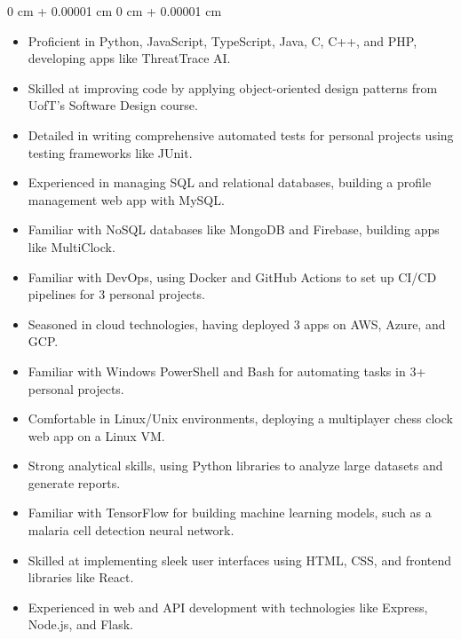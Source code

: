 \documentclass[10pt, letterpaper]{article}
\newenvironment{highlightsforbulletentries}{
    \begin{itemize}[
        topsep=0.10 cm,
        parsep=0.10 cm,
        partopsep=0pt,
        itemsep=0pt,
        leftmargin=10pt
    ]
}{
    \end{itemize}
} %
\newenvironment{onecolentry}{
    \begin{adjustwidth}{
        0 cm + 0.00001 cm
    }{
        0 cm + 0.00001 cm
    }
}{
    \end{adjustwidth}
} %
\begin{document}
    \begin{onecolentry}
        \begin{highlightsforbulletentries}


        \item Proficient in Python, JavaScript, TypeScript, Java, C, C++, and PHP, developing apps like ThreatTrace AI.

        \item Skilled at improving code by applying object-oriented design patterns from UofT’s Software Design course.

        \item Detailed in writing comprehensive automated tests for personal projects using testing frameworks like JUnit.

        \item Experienced in managing SQL and relational databases, building a profile management web app with MySQL.

        \item Familiar with NoSQL databases like MongoDB and Firebase, building apps like MultiClock.

        \item Familiar with DevOps, using Docker and GitHub Actions to set up CI/CD pipelines for 3 personal projects.

        \item Seasoned in cloud technologies, having deployed 3 apps on AWS, Azure, and GCP.

        \item Familiar with Windows PowerShell and Bash for automating tasks in 3+ personal projects.

        \item Comfortable in Linux/Unix environments, deploying a multiplayer chess clock web app on a Linux VM.

        \item Strong analytical skills, using Python libraries to analyze large datasets and generate reports.

        \item Familiar with TensorFlow for building machine learning models, such as a malaria cell detection neural network.

        \item Skilled at implementing sleek user interfaces using HTML, CSS, and frontend libraries like React.

        \item Experienced in web and API development with technologies like Express, Node.js, and Flask.


\end{highlightsforbulletentries}
\end{onecolentry}
\end{document}
